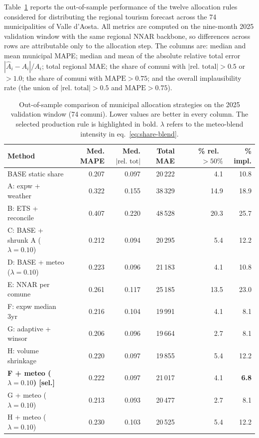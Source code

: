 \documentclass[11pt,a4paper]{article}
\begin{document}
Table~\ref{tab:alloc-comparison} reports the out-of-sample performance of the twelve allocation rules considered for distributing the regional tourism forecast across the 74 municipalities of Valle d'Aosta. All metrics are computed on the nine-month 2025 validation window with the same regional NNAR backbone, so differences across rows are attributable only to the allocation step. The columns are: median and mean municipal MAPE; median and mean of the absolute relative total error $|\hat{A}_i - A_i|/A_i$; total regional MAE; the share of comuni with $|\text{rel.\ total}| > 0.5$ or $> 1.0$; the share of comuni with $\mathrm{MAPE} > 0.75$; and the overall implausibility rate (the union of $|\text{rel.\ total}|>0.5$ and $\mathrm{MAPE}>0.75$).

\begin{table}[H]
\centering
\footnotesize
\setlength{\tabcolsep}{4pt}
\caption{Out-of-sample comparison of municipal allocation strategies on the 2025 validation window (74 comuni). Lower values are better in every column. The selected production rule is highlighted in bold. $\lambda$ refers to the meteo-blend intensity in eq.~\eqref{eq:share-blend}.}
\label{tab:alloc-comparison}
\begin{tabular}{lrrrrr}
\toprule
Method & Med. MAPE & Med. $|\text{rel.\ tot}|$ & Total MAE & \% rel.\ $>50\%$ & \% impl. \\
\midrule
BASE static share                            & 0.207 & 0.097 & 20\,222 & 4.1 & 10.8 \\
A: expw + weather                            & 0.322 & 0.155 & 38\,329 & 14.9 & 18.9 \\
B: ETS + reconcile                           & 0.407 & 0.220 & 48\,528 & 20.3 & 25.7 \\
C: BASE + shrunk A ($\lambda{=}0.10$)        & 0.212 & 0.094 & 20\,295 & 5.4 & 12.2 \\
D: BASE + meteo ($\lambda{=}0.10$)           & 0.223 & 0.096 & 21\,183 & 4.1 & 10.8 \\
E: NNAR per comune                           & 0.261 & 0.117 & 25\,185 & 13.5 & 23.0 \\
F: expw median 3yr                           & 0.216 & 0.104 & 19\,991 & 4.1 &  8.1 \\
G: adaptive + winsor                         & 0.206 & 0.096 & 19\,664 & 2.7 &  8.1 \\
H: volume shrinkage                          & 0.220 & 0.097 & 19\,855 & 5.4 & 12.2 \\
\textbf{F + meteo ($\lambda{=}0.10$) [sel.]} & 0.222 & 0.097 & 21\,017 & 4.1 & \textbf{6.8} \\
G + meteo ($\lambda{=}0.10$)                 & 0.213 & 0.093 & 20\,477 & 2.7 &  8.1 \\
H + meteo ($\lambda{=}0.10$)                 & 0.230 & 0.103 & 20\,525 & 5.4 & 12.2 \\
\bottomrule
\end{tabular}
\end{table}
\end{document}
